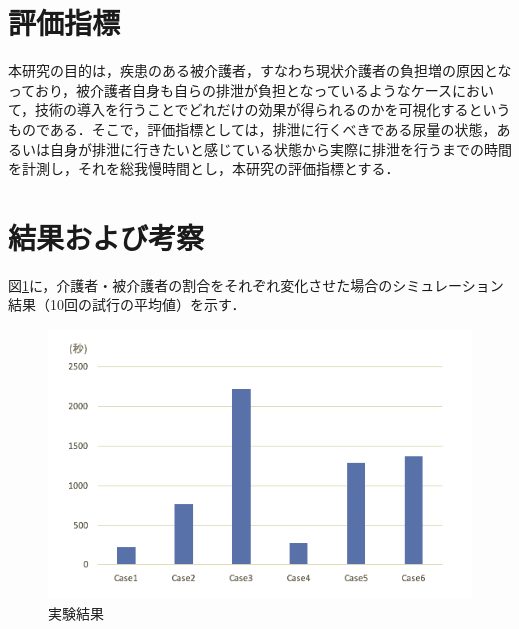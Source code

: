 \section{評価指標}

本研究の目的は，疾患のある被介護者，すなわち現状介護者の負担増の原因となっており，被介護者自身も自らの排泄が負担となっているようなケースにおいて，技術の導入を行うことでどれだけの効果が得られるのかを可視化するというものである．そこで，評価指標としては，排泄に行くべきである尿量の状態，あるいは自身が排泄に行きたいと感じている状態から実際に排泄を行うまでの時間を計測し，それを総我慢時間とし，本研究の評価指標とする．

\section{結果および考察}

図\ref{result_v1}に，介護者・被介護者の割合をそれぞれ変化させた場合のシミュレーション結果（10回の試行の平均値）を示す．

\begin{figure}[htb]
\begin{center}
 \includegraphics[scale=0.6]{figures/result_1.png}
 \caption[実験結果]{実験結果 \label{result_v1}}
\end{center}
\end{figure}
